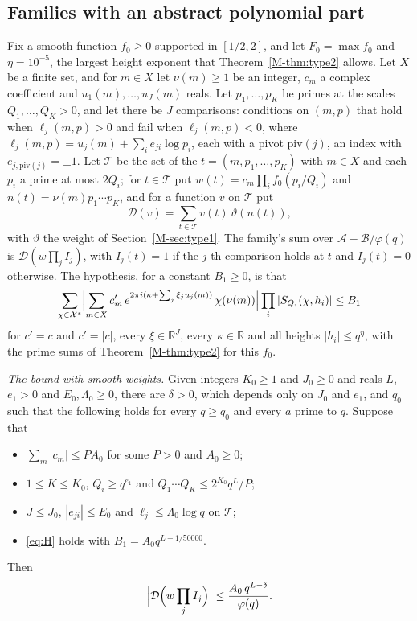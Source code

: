 \documentclass[11pt]{article}
\numberwithin{equation}{section}
\begin{document}
\subsection*{Families with an abstract polynomial part}

Fix a smooth function $f_0 \ge 0$ supported in $[1/2, 2]$, and let $F_0 = \max f_0$ and $\eta = 10^{-5}$, the largest
height exponent that Theorem~\ref{M-thm:type2} allows. Let $X$ be a finite set, and for $m \in X$ let $\nu(m) \ge 1$ be
an integer, $c_m$ a complex coefficient and $u_1(m), \dots, u_J(m)$ reals. Let $p_1, \dots, p_K$ be primes
at the scales $Q_1, \dots, Q_K > 0$, and let there be $J$ comparisons: conditions on $(m, p)$ that hold when
$\ell_j(m, p) > 0$ and fail when $\ell_j(m, p) < 0$, where $\ell_j(m, p) = u_j(m) + \sum_i e_{ji} \log p_i$, each
with a pivot $\mathrm{piv}(j)$, an index with $e_{j, \mathrm{piv}(j)} = \pm 1$. Let $\mathcal T$ be the set of the $t =
(m, p_1, \dots, p_K)$ with $m \in X$ and each $p_i$ a prime at most $2Q_i$; for $t \in \mathcal T$ put $w(t) = c_m
\prod_i f_0(p_i/Q_i)$ and $n(t) = \nu(m) p_1 \cdots p_K$, and for a function $v$ on $\mathcal T$ put
\[
  \mathcal D(v) = \sum_{t \in \mathcal T} v(t) \, \vartheta(n(t)),
\]
with $\vartheta$ the weight of Section~\ref{M-sec:type1}. The family's sum over $\mathcal A - \mathcal B/\varphi(q)$ is
$\mathcal D(w \prod_j I_j)$, with $I_j(t) = 1$ if the $j$-th comparison holds at $t$ and $I_j(t) = 0$ otherwise. The
hypothesis, for a constant $B_1 \ge
0$, is that
\begin{equation}\label{eq:H}
  \sum_{\chi \in \mathcal X^*} \Bigl|\sum_{m \in X} c'_m \, e^{2\pi i (\kappa + \sum_j \xi_j u_j(m))} \,
  \chi(\nu(m))\Bigr| \prod_i |S_{Q_i}(\chi, h_i)| \le B_1
\end{equation}
for $c' = c$ and $c' = |c|$, every $\xi \in \mathbb R^J$, every $\kappa \in \mathbb R$ and all heights $|h_i| \le
q^\eta$, with the prime sums of Theorem~\ref{M-thm:type2} for this $f_0$.

\emph{The bound with smooth weights.} Given integers $K_0 \ge 1$ and $J_0 \ge 0$ and reals $L$, $e_1 > 0$ and $E_0,
\Lambda_0 \ge 0$, there are $\delta > 0$, which depends only on $J_0$ and $e_1$, and $q_0$ such that the following holds
for every $q \ge q_0$ and every $a$ prime to $q$. Suppose that
\begin{itemize}
\item $\sum_m |c_m| \le P A_0$ for some $P > 0$ and $A_0 \ge 0$;
\item $1 \le K \le K_0$, $Q_i \ge q^{e_1}$ and $Q_1 \cdots Q_K \le 2^{K_0} q^L/P$;
\item $J \le J_0$, $|e_{ji}| \le E_0$ and $\ell_j \le \Lambda_0 \log q$ on $\mathcal T$;
\item \eqref{eq:H} holds with $B_1 = A_0 q^{L - 1/50000}$.
\end{itemize}
Then
\begin{equation}\label{eq:fam-gen}
  \Bigl|\mathcal D\Bigl(w \prod_j I_j\Bigr)\Bigr| \le \frac{A_0 \, q^{L - \delta}}{\varphi(q)}.
\end{equation}
\end{document}
